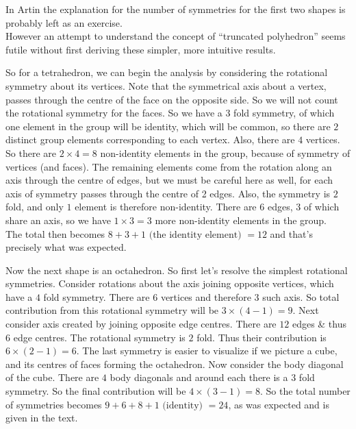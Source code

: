 In Artin the explanation for the number of symmetries for the first two shapes is probably left as an exercise.\\
However an attempt to understand the concept of ``truncated polyhedron'' seems futile without first deriving these simpler, more intuitive results.\\
\begin{aenumerate}
\item
So for a tetrahedron, we can begin the analysis by considering the rotational symmetry about its vertices. Note that the symmetrical axis about a vertex, passes through the centre of the face on the opposite side. So we will not count the rotational symmetry for the faces. So we have a $3$ fold symmetry, of which one element in the group will be identity, which will be common, so there are $2$ distinct group elements corresponding to each vertex. Also, there are $4$ vertices. So there are $2 \times 4 = 8$ non-identity elements in the group, because of symmetry of vertices (and faces). The remaining elements come from the rotation along an axis through the centre of edges, but we must be careful here as well, for each axis of symmetry passes through the centre of 2 edges. Also, the symmetry is $2$ fold, and only $1$ element is therefore non-identity. There are $6$ edges, $3$ of which share an axis, so we have $1 \times 3 = 3$ more non-identity elements in the group.\\
The total then becomes $8 + 3 + 1 \text{ (the identity element) } = 12$ and that's precisely what was expected.
\par
\item
Now the next shape is an octahedron. So first let's resolve the simplest rotational symmetries. Consider rotations about the axis joining opposite vertices, which have a $4$ fold symmetry. There are $6$ vertices and therefore $3$ such axis. So total contribution from this rotational symmetry will be $3 \times (4-1) = 9$. Next consider axis created by joining opposite edge centres. There are $12$ edges \& thus $6$ edge centres. The rotational symmetry is $2$ fold. Thus their contribution is $6 \times (2-1) = 6$. The last symmetry is easier to visualize if we picture a cube, and its centres of faces forming the octahedron. Now consider the body diagonal of the cube. There are $4$ body diagonals and around each there is a $3$ fold symmetry. So the final contribution will be $4 \times (3-1) = 8$. So the total number of symmetries becomes $9 + 6 + 8 + 1 \text { (identity) } = 24$, as was expected and is given in the text.

\end{aenumerate}
